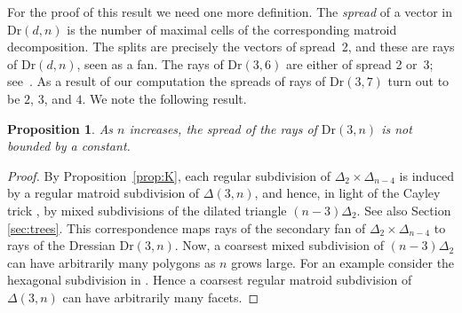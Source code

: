\documentclass[12pt,a4paper]{amsart}
\newtheorem{prop}[thm]{Proposition}
\theoremstyle{definition}
\newcommand{\Dr}{{\mathrm{Dr}}}
\begin{document}
For the proof of this result we need one more definition.  The
\emph{spread} of a vector in $\Dr(d,n)$ is the number of maximal cells
of the corresponding matroid decomposition.  The splits are precisely
the vectors of spread~2, and these are rays of $\Dr(d,n)$, seen as a
fan.  The rays of $\Dr(3,6)$ are either of spread 2 or~3;
see~\cite[\S~5]{SS}.  As a result of our computation the spreads of
rays of $\Dr(3,7)$ turn out to be $2$, $3$, and $4$. We note the
following result.

\begin{prop}
  As $n$ increases, the spread of the rays of $\Dr(3,n)$ is not
  bounded by a constant.
\end{prop}

\begin{proof}
  By Proposition~\ref{prop:K}, each regular subdivision of
  $\Delta_{2}\times\Delta_{n-4}$ is induced by a regular matroid
  subdivision of $\Delta(3,n)$, and hence, in light of the Cayley
  trick \cite{S}, by mixed subdivisions of the dilated triangle
  $(n-3)\Delta_{2}$.  See also Section \ref{sec:trees}.  This
  correspondence maps rays of the secondary fan of
  $\Delta_{2}\times\Delta_{n-4}$ to rays of the Dressian $\Dr(3,n)$.
  Now, a coarsest mixed subdivision of $(n-3)\Delta_2$ can have
  arbitrarily many polygons as $n$ grows large. For an example
  consider the hexagonal subdivision in \cite[Figure 12]{S}.  Hence a
  coarsest regular matroid subdivision of $\Delta(3,n)$ can have
  arbitrarily many facets.
\end{proof}
\end{document}

